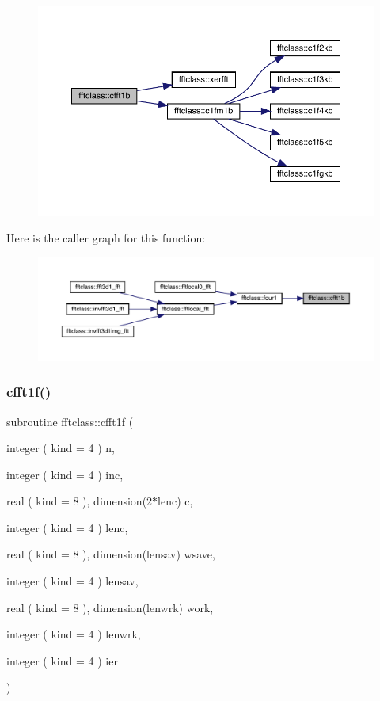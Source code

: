 \begin{figure}[H]
\begin{center}
\leavevmode
\includegraphics[width=350pt]{namespacefftclass_ad484b97b5f8fc5ab868f25d7be0de7f8_cgraph}
\end{center}
\end{figure}
Here is the caller graph for this function\+:\nopagebreak
\begin{figure}[H]
\begin{center}
\leavevmode
\includegraphics[width=350pt]{namespacefftclass_ad484b97b5f8fc5ab868f25d7be0de7f8_icgraph}
\end{center}
\end{figure}
\mbox{\label{namespacefftclass_a8ecbd8fa5a63e3cef089dbe7e91c6438}} 
\subsubsection{\texorpdfstring{cfft1f()}{cfft1f()}}
{\footnotesize\ttfamily subroutine fftclass\+::cfft1f (\begin{DoxyParamCaption}\item[{integer ( kind = 4 )}]{n,  }\item[{integer ( kind = 4 )}]{inc,  }\item[{real ( kind = 8 ), dimension(2$\ast$lenc)}]{c,  }\item[{integer ( kind = 4 )}]{lenc,  }\item[{real ( kind = 8 ), dimension(lensav)}]{wsave,  }\item[{integer ( kind = 4 )}]{lensav,  }\item[{real ( kind = 8 ), dimension(lenwrk)}]{work,  }\item[{integer ( kind = 4 )}]{lenwrk,  }\item[{integer ( kind = 4 )}]{ier }\end{DoxyParamCaption})}



